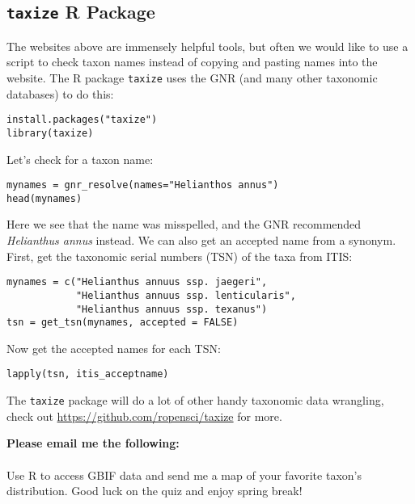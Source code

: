 \documentclass[11pt]{article}
\begin{document}
\subsection{\texttt{taxize} R Package}

The websites above are immensely helpful tools, but often we would like to use 
a script to check taxon names instead of copying and pasting names into the website.
The R package \texttt{taxize} uses the GNR (and many other taxonomic databases)
to do this:

\begin{verbatim}
install.packages("taxize")
library(taxize)
\end{verbatim}

Let's check for a taxon name:

\begin{verbatim}
mynames = gnr_resolve(names="Helianthos annus")
head(mynames)
\end{verbatim}

Here we see that the name was misspelled, and the GNR recommended \textit{Helianthus annus} instead.
We can also get an accepted name from a synonym.
First, get the taxonomic serial numbers (TSN) of the taxa from ITIS:

\begin{verbatim}
mynames = c("Helianthus annuus ssp. jaegeri", 
            "Helianthus annuus ssp. lenticularis", 
            "Helianthus annuus ssp. texanus")
tsn = get_tsn(mynames, accepted = FALSE)
\end{verbatim}

Now get the accepted names for each TSN:

\begin{verbatim}
lapply(tsn, itis_acceptname)
\end{verbatim}

The \texttt{taxize} package will do a lot of other handy taxonomic data wrangling,
check out \url{https://github.com/ropensci/taxize} for more.


\begin{framed}
\noindent
\textbf{Please email me the following:} \\
\\
Use R to access GBIF data 
and send me a map of your favorite taxon's distribution.
Good luck on the quiz and enjoy spring break!
\end{framed}

%
% 
\end{document}
